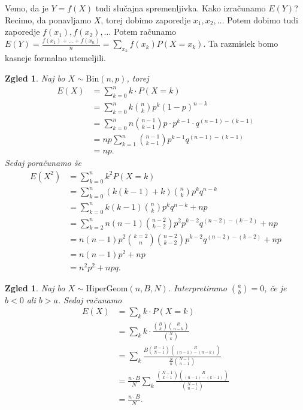 \documentclass[10pt, a4paper]{article}
\newtheorem{zgled}[izr]{Zgled}
\begin{document}
Vemo, da je $Y = f(X)$ tudi slučajna spremenljivka. Kako izračunamo $E(Y)$?
Recimo, da ponavljamo $X$, torej dobimo zaporedje $x_1, x_2, \dots$ Potem dobimo tudi zaporedje 
$f(x_1), f(x_2), \dots$ Potem računamo $E(Y) = \frac{f(x_1) + \dots + f(x_n)}{n} = \sum_{x_k} f(x_k) P(X = x_k)$.
Ta razmislek bomo kasneje formalno utemeljili.

\begin{zgled}
  Naj bo $X \sim \mathrm{Bin} (n, p)$, torej 
  \begin{align*}
    E(X) &= \sum_{k = 0}^n k \cdot P(X = k)\\
    &= \sum_{k = 0} ^n k \binom{n}{k} p^k (1 - p)^{n - k}\\
    &= \sum_{k = 0} ^n n \binom{n - 1}{k - 1} p \cdot p^{k - 1} \cdot q^{(n - 1) - (k - 1)}\\
    &= np \sum_{k = 1} ^n \binom{n - 1}{k - 1} p^{k - 1} q^{(n - 1) - (k - 1)}\\
    &= np.
  \end{align*}
  Sedaj poračunamo še 
  \begin{align*}
    E(X^2) &= \sum_{k = 0} ^n k^2 P(X = k)\\
    &= \sum_{k = 0} ^n (k(k - 1) + k) \binom{n}{k} p^k q^{n - k}\\
    &= \sum_{k = 0} ^n k (k - 1) \binom{n}{k} p^k q^{n - k} + np\\
    &= \sum_{k = 2} ^n n(n - 1) \binom{n - 2}{k - 2} p^2 p^{k - 2} q^{(n - 2) - (k - 2)} + np\\
    &= n(n - 1) p^2 \binom{k = 2}{n} \binom{n - 2}{k - 2} p^{k - 2} q^{(n - 2) - (k - 2)} + np\\
    &= n(n - 1)p^2 + np\\
    &= n^2 p^2 + npq.
  \end{align*}
\end{zgled}

\begin{zgled}
  Naj bo $X \sim \mathrm{HiperGeom} (n, B, N)$.
  Interpretiramo $\binom{a}{b} = 0$, če je $b < 0$ ali $b > a$. Sedaj računamo 
  \begin{align*}
    E(X) &= \sum_{k} k \cdot P(X = k)\\
    &= \sum_k k \cdot \frac{\binom{B}{k}\binom{R}{n - k}}{\binom{N}{k}}\\
    &= \sum_k \frac{B \binom{B - 1}{N - 1} \binom{R}{(n - 1) - (n - k)}}{\frac{N}{n} \binom{N - 1}{n - 1}}\\
    &= \frac{n \cdot B}{N} \sum_k \frac{\binom{N - 1}{k - 1} \binom{R}{(n - 1) - (k -1)}}{\binom{N - 1}{n - 1}}\\
    &= \frac{n \cdot B}{N}.
  \end{align*}
\end{zgled}
\end{document}
